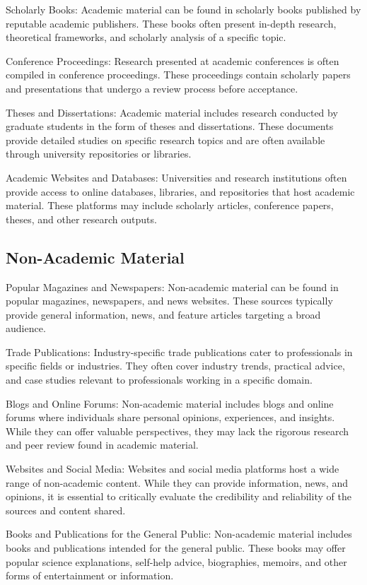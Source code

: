 \begin{spacing}{2.0}
Scholarly Books: Academic material can be found in scholarly books published by reputable academic publishers. These books often present in-depth research, theoretical frameworks, and scholarly analysis of a specific topic.

Conference Proceedings: Research presented at academic conferences is often compiled in conference proceedings. These proceedings contain scholarly papers and presentations that undergo a review process before acceptance.

Theses and Dissertations: Academic material includes research conducted by graduate students in the form of theses and dissertations. These documents provide detailed studies on specific research topics and are often available through university repositories or libraries.

Academic Websites and Databases: Universities and research institutions often provide access to online databases, libraries, and repositories that host academic material. These platforms may include scholarly articles, conference papers, theses, and other research outputs.

\subsection{Non-Academic Material}

Popular Magazines and Newspapers: Non-academic material can be found in popular magazines, newspapers, and news websites. These sources typically provide general information, news, and feature articles targeting a broad audience.

Trade Publications: Industry-specific trade publications cater to professionals in specific fields or industries. They often cover industry trends, practical advice, and case studies relevant to professionals working in a specific domain.

Blogs and Online Forums: Non-academic material includes blogs and online forums where individuals share personal opinions, experiences, and insights. While they can offer valuable perspectives, they may lack the rigorous research and peer review found in academic material.

Websites and Social Media: Websites and social media platforms host a wide range of non-academic content. While they can provide information, news, and opinions, it is essential to critically evaluate the credibility and reliability of the sources and content shared.

Books and Publications for the General Public: Non-academic material includes books and publications intended for the general public. These books may offer popular science explanations, self-help advice, biographies, memoirs, and other forms of entertainment or information.


\end{spacing}
